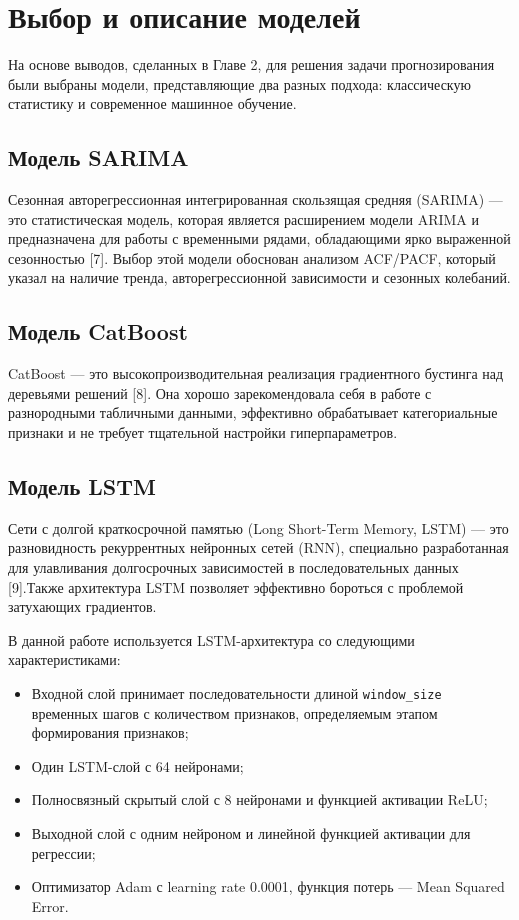 \section{Выбор и описание моделей}
\label{sec:model_selection}

\hspace*{1.25cm}На основе выводов, сделанных в Главе 2, для решения задачи прогнозирования были выбраны модели, представляющие два разных подхода: классическую статистику и современное машинное обучение.

\subsection{Модель SARIMA}
\hspace*{1.25cm}Сезонная авторегрессионная интегрированная скользящая средняя (SARIMA) — это статистическая модель, которая является расширением модели ARIMA и предназначена для работы с временными рядами, обладающими ярко выраженной сезонностью [7]. Выбор этой модели обоснован анализом ACF/PACF, который указал на наличие тренда, авторегрессионной зависимости и сезонных колебаний.

\subsection{Модель CatBoost}
\hspace*{1.25cm}CatBoost — это высокопроизводительная реализация градиентного бустинга над деревьями решений [8]. Она хорошо зарекомендовала себя в работе с разнородными табличными данными, эффективно обрабатывает категориальные признаки и не требует тщательной настройки гиперпараметров.

\subsection{Модель LSTM}
\hspace*{1.25cm}Сети с долгой краткосрочной памятью (Long Short-Term Memory, LSTM) — это разновидность рекуррентных нейронных сетей (RNN), специально разработанная для улавливания долгосрочных зависимостей в последовательных данных [9].Также архитектура LSTM позволяет эффективно бороться с проблемой затухающих градиентов.

\hspace*{1.25cm}В данной работе используется LSTM-архитектура со следующими характеристиками:
\begin{itemize}
	\item Входной слой принимает последовательности длиной \texttt{window\_size} временных шагов с количеством признаков, определяемым этапом формирования признаков;
	\item Один LSTM-слой с 64 нейронами;
	\item Полносвязный скрытый слой с 8 нейронами и функцией активации ReLU;
	\item Выходной слой с одним нейроном и линейной функцией активации для регрессии;
	\item Оптимизатор Adam с learning rate 0.0001, функция потерь --- Mean Squared Error.
\end{itemize}